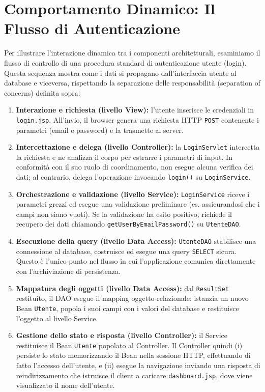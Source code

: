 \section{Comportamento Dinamico: Il Flusso di Autenticazione}
Per illustrare l'interazione dinamica tra i componenti architetturali, esaminiamo il flusso di controllo di una procedura standard di autenticazione utente (login). Questa sequenza mostra come i dati si propagano dall'interfaccia utente al database e viceversa, rispettando la separazione delle responsabilità (separation of concerns) definita sopra:
\begin{enumerate}
	\item \textbf{Interazione e richiesta (livello View):} l'utente inserisce le credenziali in \texttt{login.jsp}. All'invio, il browser genera una richiesta HTTP \texttt{POST} contenente i parametri (email e password) e la trasmette al server.
	\item \textbf{Intercettazione e delega (livello Controller):} la \texttt{LoginServlet} intercetta la richiesta e ne analizza il corpo per estrarre i parametri di input. In conformità con il suo ruolo di coordinamento, non esegue alcuna verifica dei dati; al contrario, delega l'operazione invocando \texttt{login()} su \texttt{LoginService}.
	\item \textbf{Orchestrazione e validazione (livello Service):} \texttt{LoginService} riceve i parametri grezzi ed esegue una validazione preliminare (es. assicurandosi che i campi non siano vuoti). Se la validazione ha esito positivo, richiede il recupero dei dati chiamando \texttt{getUserByEmailPassword()} su \texttt{UtenteDAO}.
	\item \textbf{Esecuzione della query (livello Data Access):} \texttt{UtenteDAO} stabilisce una connessione al database, costruisce ed esegue una query \texttt{SELECT} sicura. Questo è l'unico punto nel flusso in cui l'applicazione comunica direttamente con l'archiviazione di persistenza.
	\item \textbf{Mappatura degli oggetti (livello Data Access):} dal \texttt{ResultSet} restituito, il DAO esegue il mapping oggetto-relazionale: istanzia un nuovo Bean \texttt{Utente}, popola i suoi campi con i valori del database e restituisce l'oggetto al livello Service.
	\item \textbf{Gestione dello stato e risposta (livello Controller):} il Service restituisce il Bean \texttt{Utente} popolato al Controller. Il Controller quindi (i) persiste lo stato memorizzando il Bean nella sessione HTTP, effettuando di fatto l'accesso dell'utente, e (ii) esegue la navigazione inviando una risposta di reindirizzamento che istruisce il client a caricare \texttt{dashboard.jsp}, dove viene visualizzato il nome dell'utente.
\end{enumerate}

